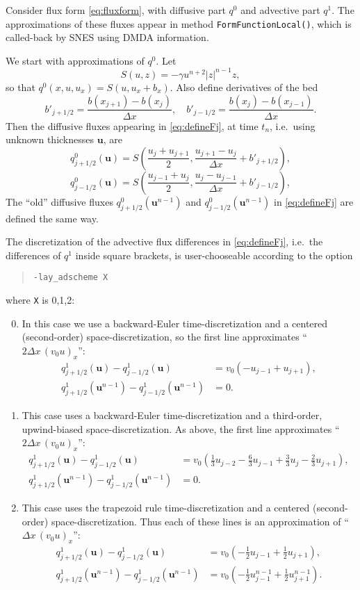 \documentclass[11pt]{amsart}
\newcommand\bu{\mathbf{u}}
\begin{document}
Consider flux form \eqref{eq:fluxform}, with diffusive part $q^0$ and advective part $q^1$.  The approximations of these fluxes appear in method \verb|FormFunctionLocal()|, which is called-back by SNES using DMDA information.

We start with approximations of $q^0$.  Let
	$$S(u,z) = - \gamma u^{n+2} |z|^{n-1} z,$$
so that $q^0(x,u,u_x) = S(u,u_x+b_x)$.  Also define derivatives of the bed
	$$b'_{j+1/2} = \frac{b(x_{j+1}) - b(x_j)}{\Delta x}, \quad b'_{j-1/2} = \frac{b(x_j) - b(x_{j-1})}{\Delta x}.$$
Then the diffusive fluxes appearing in \eqref{eq:defineFj}, at time $t_n$, i.e.~using unknown thicknesses $\bu$, are
    $$q^0_{j+1/2}(\bu) = S\left(\frac{u_j+u_{j+1}}{2},\frac{u_{j+1}-u_j}{\Delta x} + b'_{j+1/2}\right),$$
    $$q^0_{j-1/2}(\bu) = S\left(\frac{u_{j-1}+u_j}{2},\frac{u_j-u_{j-1}}{\Delta x} + b'_{j-1/2}\right),$$
The ``old'' diffusive fluxes $q^0_{j+1/2}(\bu^{n-1})$ and $q^0_{j-1/2}(\bu^{n-1})$ in \eqref{eq:defineFj} are defined the same way.

The discretization of the advective flux differences in \eqref{eq:defineFj}, i.e.~the differences of $q^1$ inside square brackets, is user-chooseable according to the option
\begin{quote}
\verb|-lay_adscheme X|
\end{quote}
where \verb|X| is 0,1,2:
\medskip
\renewcommand{\labelenumi}{\texttt{X}$=$\arabic{enumi}: \quad}
\begin{enumerate}
\setcounter{enumi}{-1}
\item %
In this case we use a backward-Euler time-discretization and a centered (second-order) space-discretization, so the first line approximates ``$2 \Delta x\,(v_0 u)_x$'':
\begin{align*}
q^1_{j+1/2}(\bu) - q^1_{j-1/2}(\bu)             &= v_0 \left( - u_{j-1} + u_{j+1} \right), \\
q^1_{j+1/2}(\bu^{n-1}) - q^1_{j-1/2}(\bu^{n-1}) &= 0.
\end{align*}
\item %
This case uses a backward-Euler time-discretization and a third-order, upwind-biased space-discretization.  As above, the first line approximates ``$2 \Delta x\,(v_0 u)_x$'':
\begin{align*}
q^1_{j+1/2}(\bu) - q^1_{j-1/2}(\bu)             &= v_0 \left( \tfrac{1}{3} u_{j-2} - \tfrac{6}{3} u_{j-1} + \tfrac{3}{3} u_j - \tfrac{2}{3} u_{j+1} \right), \\
q^1_{j+1/2}(\bu^{n-1}) - q^1_{j-1/2}(\bu^{n-1}) &= 0.
\end{align*}
\item %
This case uses the trapezoid rule time-discretization and a centered (second-order) space-discretization.  Thus each of these lines is an approximation of ``$\Delta x\,(v_0 u)_x$'':
\begin{align*}
q^1_{j+1/2}(\bu) - q^1_{j-1/2}(\bu)             &= v_0 \left( - \tfrac{1}{2} u_{j-1} + \tfrac{1}{2} u_{j+1} \right), \\
q^1_{j+1/2}(\bu^{n-1}) - q^1_{j-1/2}(\bu^{n-1}) &= v_0 \left( - \tfrac{1}{2} u_{j-1}^{n-1} + \tfrac{1}{2} u_{j+1}^{n-1} \right).
\end{align*}
\end{enumerate}
\end{document}
